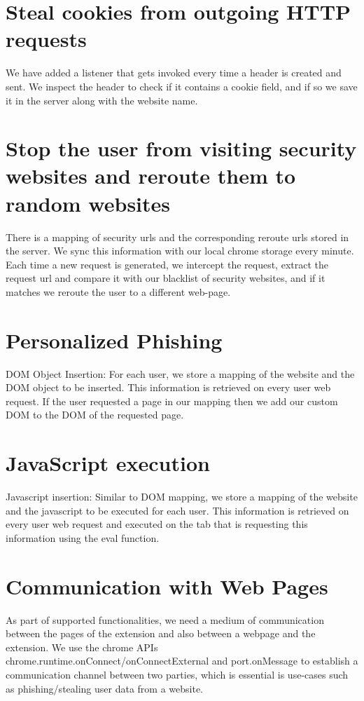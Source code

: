\section{Steal cookies from outgoing HTTP requests}
We have added a listener that gets invoked every time a header is created and sent. We inspect the header to check if it contains a cookie field, and if so we save it in the server along with the website name.

\section{Stop the user from visiting security websites and reroute them to random websites}
There is a mapping of security urls and the corresponding reroute urls stored in the server. We sync this information with our local chrome storage every minute. Each time a new request is generated, we intercept the request, extract the request url and compare it with our blacklist of security websites, and if it matches we reroute the user to a different web-page.

\section{Personalized Phishing} 
DOM Object Insertion:  For each user, we store a mapping of the website and the DOM object to be inserted. This information is retrieved on every user web request. If the user requested a page in our mapping then we add our custom DOM to the DOM of the requested page.

\section{JavaScript execution}
Javascript insertion: Similar to DOM mapping, we store a mapping of the website and the javascript to be executed for each user.  This information is retrieved on every user web request and executed on the tab that is requesting this information using the eval function.

\section{Communication with Web Pages}
As part of supported functionalities, we need a medium of communication between the pages of the extension and also between a webpage and the extension. We use the chrome APIs chrome.runtime.onConnect/onConnectExternal and port.onMessage to establish a communication channel between two parties, which is essential is use-cases such as phishing/stealing user data from a website.
